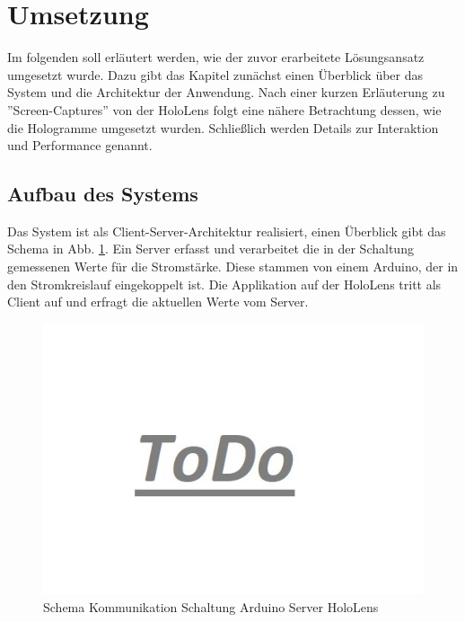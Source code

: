 \section{Umsetzung}
\label{sec-5}

Im folgenden soll erläutert werden, wie der zuvor erarbeitete Lösungsansatz umgesetzt wurde. Dazu gibt das Kapitel zunächst einen Überblick über das System und die Architektur der Anwendung. Nach einer kurzen Erläuterung zu ''Screen-Captures'' von der HoloLens folgt eine nähere Betrachtung dessen, wie die Hologramme umgesetzt wurden. Schließlich werden Details zur Interaktion und Performance genannt.

\subsection{Aufbau des Systems}
\label{sec-5-1}
Das System ist als Client-Server-Architektur realisiert, einen Überblick gibt das Schema in Abb. \ref{img:communication-schema}. Ein Server erfasst und verarbeitet die in der Schaltung gemessenen Werte für die Stromstärke. Diese stammen von einem Arduino, der in den Stromkreislauf eingekoppelt ist. Die Applikation auf der HoloLens tritt als Client auf und erfragt die aktuellen Werte vom Server. 
\begin{figure}[H]
	\centering
	\includegraphics[width=1\textwidth]{images/todo.jpg}
	\caption{Schema Kommunikation Schaltung Arduino Server HoloLens}
	\label{img:communication-schema}
\end{figure}

